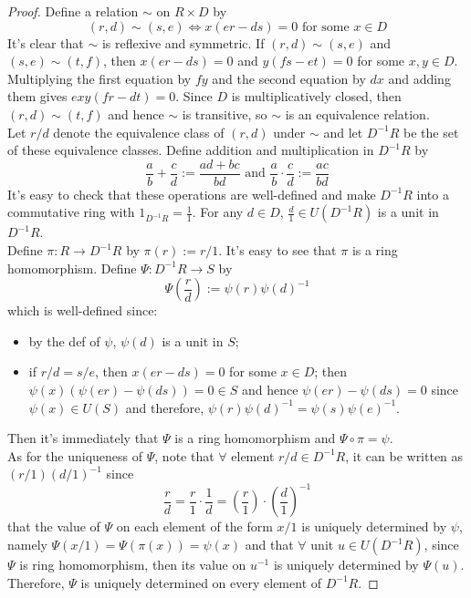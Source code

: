 \begin{proof}
    Define a relation $\sim$ on $R \times D$ by
    $$(r,d) \sim (s,e) \Leftrightarrow x(er-ds)=0 \text{ for some } x\in D$$
    It's clear that $\sim$ is reflexive and symmetric. If $(r,d) \sim (s,e)$ and $(s,e) \sim (t,f)$, then $x(er-ds)=0$ and $y(fs-et) =0$ for some $x,y \in D$. Multiplying the first equation by $fy$ and the second equation by $dx$ and adding them gives $exy(fr-dt) =0$. Since $D$ is multiplicatively closed, then $(r,d) \sim (t,f)$ and hence $\sim$ is transitive, so $\sim$ is an equivalence relation.\\
    Let $r/d$ denote the equivalence class of $(r,d)$ under $\sim$ and let $D^{-1}R$ be the set of these equivalence classes. Define addition and multiplication in $D^{-1}R$ by
    \[
    \frac{a}{b} + \frac{c}{d} := \frac{ad+bc}{bd} \text{ and } \frac{a}{b} \cdot \frac{c}{d} := \frac{ac}{bd}
    \]
    It's easy to check that these operations are well-defined and make $D^{-1}R$ into a commutative ring with $1_{D^{-1}R} = \frac{1}{1}$. For any $d \in D$, $\frac{d}{1} \in U(D^{-1} R)$ is a unit in $D^{-1}R$.\\
    Define $\pi: R\to D^{-1}R$ by $\pi(r) := r/1$. It's easy to see that $\pi$ is a ring homomorphism. Define $\Psi: D^{-1}R \to S$ by
    $$\Psi(\frac{r}{d}) := \psi(r) \psi(d)^{-1}$$
    which is well-defined since:
    \begin{itemize}
        \item by the def of $\psi$, $\psi (d)$ is a unit in $S$;
        \item if $r/d=s/e$, then $x(er-ds) =0$ for some $x\in D$; then $\psi(x) (\psi(er) -\psi(ds)) =0 \in S$ and hence $\psi(er) -\psi(ds) =0$ since $\psi(x) \in U(S)$ and therefore, $\psi(r) \psi(d)^{-1} = \psi(s) \psi(e)^{-1}$.
    \end{itemize}
    Then it's immediately that $\Psi$ is a ring homomorphism and $\Psi \circ \pi =\psi$.\\
    As for the uniqueness of $\Psi$, note that $\forall$ element $r/d \in D^{-1}R$, it can be written as $(r/1) (d/1)^{-1}$ since
    $$\frac{r}{d} = \frac{r}{1} \cdot \frac{1}{d} = (\frac{r}{1}) \cdot (\frac{d}{1})^{-1}$$
    that the value of $\Psi$ on each element of the form $x/1$ is uniquely determined by $\psi$, namely $\Psi(x/1) =\Psi(\pi(x)) =\psi(x)$ and that $\forall$ unit $u\in U(D^{-1}R)$, since $\Psi$ is ring homomorphism, then its value on $u^{-1}$ is uniquely determined by $\Psi(u)$. Therefore, $\Psi$ is uniquely determined on every element of $D^{-1}R$.
\end{proof}

